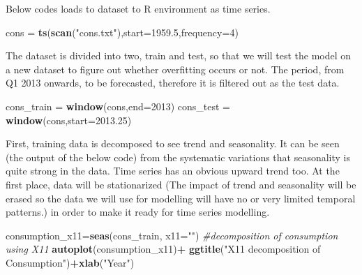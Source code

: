 \documentclass[
]{article}
\newenvironment{Shaded}{\begin{snugshade}}{\end{snugshade}}
\newcommand{\CommentTok}[1]{\textcolor[rgb]{0.56,0.35,0.01}{\textit{#1}}}
\newcommand{\DataTypeTok}[1]{\textcolor[rgb]{0.13,0.29,0.53}{#1}}
\newcommand{\DecValTok}[1]{\textcolor[rgb]{0.00,0.00,0.81}{#1}}
\newcommand{\FloatTok}[1]{\textcolor[rgb]{0.00,0.00,0.81}{#1}}
\newcommand{\KeywordTok}[1]{\textcolor[rgb]{0.13,0.29,0.53}{\textbf{#1}}}
\newcommand{\NormalTok}[1]{#1}
\newcommand{\OperatorTok}[1]{\textcolor[rgb]{0.81,0.36,0.00}{\textbf{#1}}}
\newcommand{\StringTok}[1]{\textcolor[rgb]{0.31,0.60,0.02}{#1}}
\begin{document}
Below codes loads to dataset to R environment as time series.

\begin{Shaded}
\begin{Highlighting}[]
\NormalTok{cons =}\StringTok{ }\KeywordTok{ts}\NormalTok{(}\KeywordTok{scan}\NormalTok{(}\StringTok{"cons.txt"}\NormalTok{),}\DataTypeTok{start=}\FloatTok{1959.5}\NormalTok{,}\DataTypeTok{frequency=}\DecValTok{4}\NormalTok{)}
\end{Highlighting}
\end{Shaded}

The dataset is divided into two, train and test, so that we will test
the model on a new dataset to figure out whether overfitting occurs or
not. The period, from Q1 2013 onwards, to be forecasted, therefore it is
filtered out as the test data.

\begin{Shaded}
\begin{Highlighting}[]
\NormalTok{cons_train =}\StringTok{ }\KeywordTok{window}\NormalTok{(cons,}\DataTypeTok{end=}\DecValTok{2013}\NormalTok{)}
\NormalTok{cons_test =}\StringTok{ }\KeywordTok{window}\NormalTok{(cons,}\DataTypeTok{start=}\FloatTok{2013.25}\NormalTok{)}
\end{Highlighting}
\end{Shaded}

First, training data is decomposed to see trend and seasonality. It can
be seen (the output of the below code) from the systematic variations
that seasonality is quite strong in the data. Time series has an obvious
upward trend too. At the first place, data will be stationarized (The
impact of trend and seasonality will be erased so the data we will use
for modelling will have no or very limited temporal patterns.) in order
to make it ready for time series modelling.

\begin{Shaded}
\begin{Highlighting}[]
\NormalTok{consumption_x11=}\KeywordTok{seas}\NormalTok{(cons_train, }\DataTypeTok{x11=}\StringTok{""}\NormalTok{) }\CommentTok{#decomposition of consumption using X11}
\KeywordTok{autoplot}\NormalTok{(consumption_x11)}\OperatorTok{+}
\StringTok{  }\KeywordTok{ggtitle}\NormalTok{(}\StringTok{"X11 decomposition of Consumption"}\NormalTok{)}\OperatorTok{+}\KeywordTok{xlab}\NormalTok{(}\StringTok{"Year"}\NormalTok{)}
\end{Highlighting}
\end{Shaded}
\end{document}
